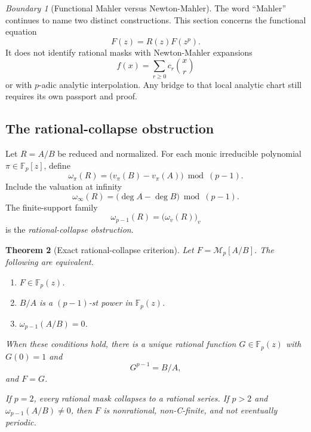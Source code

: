 \documentclass[11pt]{article}
\newtheorem{theorem}{Theorem}[section]
\theoremstyle{definition}
\theoremstyle{remark}
\newtheorem{boundary}[theorem]{Boundary}
\begin{document}
\begin{boundary}[Functional Mahler versus Newton-Mahler]
The word ``Mahler'' continues to name two distinct constructions.  This section concerns the functional equation
\[
F(z)=R(z)F(z^p).
\]
It does not identify rational masks with Newton-Mahler expansions
\[
f(x)=\sum_{r\geq0}c_r\binom xr
\]
or with \(p\)-adic analytic interpolation.  Any bridge to that local analytic chart still requires its own passport and proof.
\end{boundary}

\subsection{The rational-collapse obstruction}

Let \(R=A/B\) be reduced and normalized.  For each monic irreducible polynomial \(\pi\in\mathbb F_p[z]\), define
\[
\omega_{\pi}(R)
=
\bigl(v_{\pi}(B)-v_{\pi}(A)\bigr)\bmod(p-1).
\]
Include the valuation at infinity
\[
\omega_{\infty}(R)
=
\bigl(\deg A-\deg B\bigr)\bmod(p-1).
\]
The finite-support family
\begin{equation}
\label{eq:block04-collapse-obstruction}
\omega_{p-1}(R)
=
\bigl(\omega_v(R)\bigr)_v
\end{equation}
is the \emph{rational-collapse obstruction}.

\begin{theorem}[Exact rational-collapse criterion]
\label{thm:rational-collapse-criterion}
Let \(F=\mathcal M_p[A/B]\).  The following are equivalent.
\begin{enumerate}[label=\textup{(\roman*)}]
\item \(F\in\mathbb F_p(z)\).
\item \(B/A\) is a \((p-1)\)-st power in \(\mathbb F_p(z)\).
\item \(\omega_{p-1}(A/B)=0\).
\end{enumerate}
When these conditions hold, there is a unique rational function \(G\in\mathbb F_p(z)\) with \(G(0)=1\) and
\[
G^{p-1}=B/A,
\]
and \(F=G\).

If \(p=2\), every rational mask collapses to a rational series.  If \(p>2\) and \(\omega_{p-1}(A/B)\neq0\), then \(F\) is nonrational, non-C-finite, and not eventually periodic.
\end{theorem}
\end{document}
